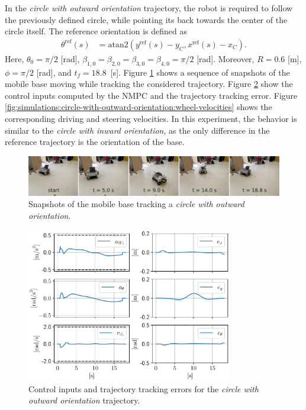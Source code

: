 In the \textit{circle with outward orientation} trajectory, the robot is
required to follow the previously defined circle, while pointing its back
towards the center of the circle itself. The reference orientation is defined as
\begin{subequations}
\begin{align*}
    \theta^{\mathrm{ref}}(s) &= \mathrm{atan2}(y^{\mathrm{ref}}(s) - y_C, x^{\mathrm{ref}}(s) - x_C).
\end{align*}
\end{subequations}
Here, $\theta_0=\pi/2$ [rad], $\beta_{1,0}=\beta_{2,0}=\beta_{3,0}=\beta_{4,0}=\pi/2$
[rad]. Moreover, $R=0.6$ [m], $\phi=\pi/2$ [rad], and $t_f=18.8$~[s].
Figure \ref{fig:experiments:circle-with-outward-orientation:snapshots} shows
a sequence of snapshots of the mobile base moving while tracking the
considered trajectory.
Figure \ref{fig:simulations:circle-with-outward-orientation:inputs-and-errors}
show the control inputs computed by the NMPC and the trajectory tracking error.
Figure \ref{fig:simulations:circle-with-outward-orientation:wheel-velocities}
shows the corresponding driving and steering velocities. In this experiment,
the behavior is similar to the \textit{circle with inward orientation}, as the 
only difference in the reference trajectory is the orientation of the base.
\begin{figure}
    \centering
    \includegraphics[width=\textwidth]{figures/SWMR/simulations/circular_with_outward_orientation/snapshots.jpeg}
    \caption{Snapshots of the mobile base tracking a \textit{circle with outward orientation}.}
    \label{fig:experiments:circle-with-outward-orientation:snapshots}
\end{figure}
\begin{figure}
    \centering
    \includegraphics[width=0.8\textwidth]{figures/SWMR/simulations/circular_with_outward_orientation/inputs_and_errors.pdf}
    \caption{Control inputs and trajectory tracking errors for the \textit{circle with outward orientation} trajectory.}
    \label{fig:simulations:circle-with-outward-orientation:inputs-and-errors}
\end{figure}
